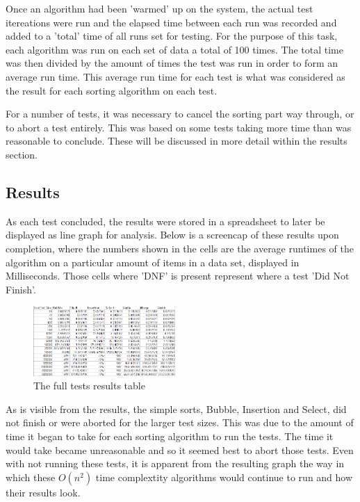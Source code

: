 \documentclass{acm_proc_article-sp}
\begin{document}
Once an algorithm had been 'warmed' up on the system, the actual test itereations were run and the elapsed time between
each run was recorded and added to a 'total' time of all runs set for testing. For
the purpose of this task, each algorithm was run on each set of data a total of 100
times. The total time was then divided by the amount of times the test
was run in order to form an average run time. This average run time for each test
is what was considered as the result for each sorting algorithm on each test.

For a number of tests, it was necessary to cancel the sorting part way through, 
or to abort a test entirely. This was based on some tests taking more time than was
reasonable to conclude. These will be discussed in more detail within the
results section.

\subsection{Results}
As each test concluded, the results were stored in a spreadsheet to later
be displayed as line graph for analysis.
Below is a screencap of these results upon completion, where the numbers
shown in the cells are the average runtimes of the algorithm on a particular
amount of items in a data set, displayed in Milliseconds. Those cells where 'DNF' is present 
represent where a test 'Did Not Finish'.

\begin{figure}[h]
\centering
\includegraphics[width=0.48\textwidth]{img/results_table.png}
\caption{The full tests results table}
\end{figure}

As is visible from the results, the simple sorts, Bubble, Insertion and Select,
did not finish or were aborted for the larger test sizes. This was due to the amount of time it began to
take for each sorting algorithm to run the tests. The time it would take became
unreasonable and so it seemed best to abort those tests. Even with not running
these tests, it is apparent from the resulting graph the way in which these  \begin{math}O(n^2)\end{math} time complextity\cite{timec} algorithms
would continue to run and how their results look.
\end{document}
